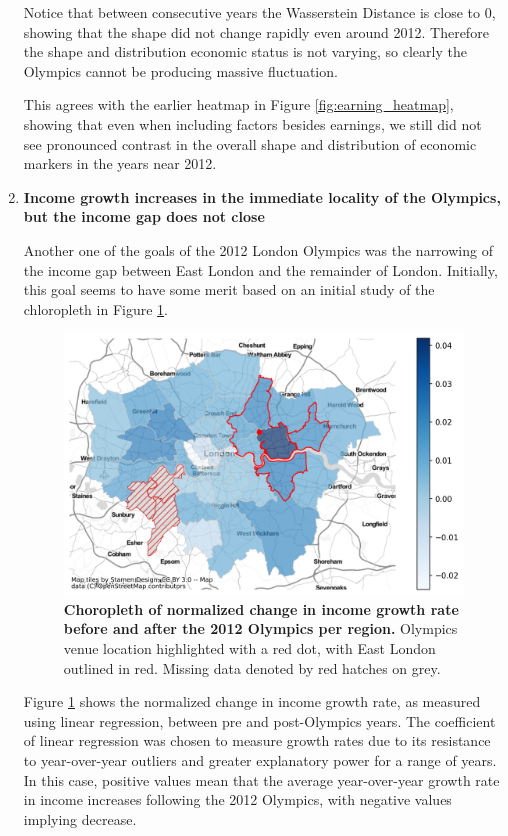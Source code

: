 \documentclass[11pt, twocolumn]{article}
\begin{document}
\begin{enumerate}
    Notice that between consecutive years the Wasserstein Distance is close to 0, showing that the shape did not change rapidly even around 2012. Therefore the shape and distribution economic status is not varying, so clearly the Olympics cannot be producing massive fluctuation. 
    
    This agrees with the earlier heatmap in Figure \ref{fig:earning_heatmap}, showing that even when including factors besides earnings, we still did not see pronounced contrast in the overall shape and distribution of economic markers in the years near 2012.
    
    \item \textbf{Income growth increases in the immediate locality of the Olympics, but the income gap does not close}
    
    Another one of the goals of the 2012 London Olympics was the narrowing of the income gap between East London and the remainder of London. Initially, this goal seems to have some merit based on an initial study of the chloropleth in Figure \ref{fig:income_chloropleth}.
    
    \begin{figure}[H]
        \centering
            \includegraphics[scale=0.5]{income_slope.png}
        \caption{\textbf{Choropleth of normalized change in income growth rate before and after the 2012 Olympics per region.} Olympics venue location highlighted with a red dot, with East London outlined in red. Missing data denoted by red hatches on grey.}
        \label{fig:income_chloropleth}
    \end{figure}
    
    Figure \ref{fig:income_chloropleth} shows the normalized change in income growth rate, as measured using linear regression, between pre and post-Olympics years. The coefficient of linear regression was chosen to measure growth rates due to its resistance to year-over-year outliers and greater explanatory power for a range of years. In this case, positive values mean that the average year-over-year growth rate in income increases following the 2012 Olympics, with negative values implying decrease.
    

\end{enumerate}
\end{document}
